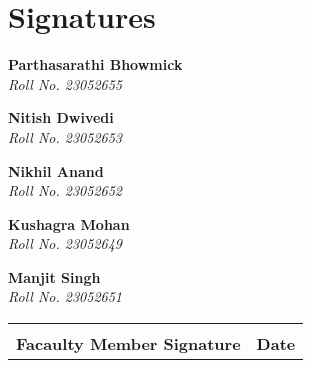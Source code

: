 \section*{Signatures}

\newcommand{\signature}[2]{
\noindent\begin{minipage}{0.5\textwidth}
\vspace*{2cm}
\hrulefill

\textbf{#1} \\ \textit{Roll No. #2}
\end{minipage}
}

\signature{Parthasarathi Bhowmick}{23052655}
\signature{Nitish Dwivedi}{23052653}
\signature{Nikhil Anand}{23052652}
\signature{Kushagra Mohan}{23052649}
\signature{Manjit Singh}{23052651}

\bigskip\bigskip\bigskip\bigskip
\bigskip\bigskip\bigskip\bigskip

\begin{tabular}{p{}p{}}
    \hrulefill & \hrulefill \\
    \textbf{Facaulty Member Signature} & \textbf{Date} \\
\end{tabular}